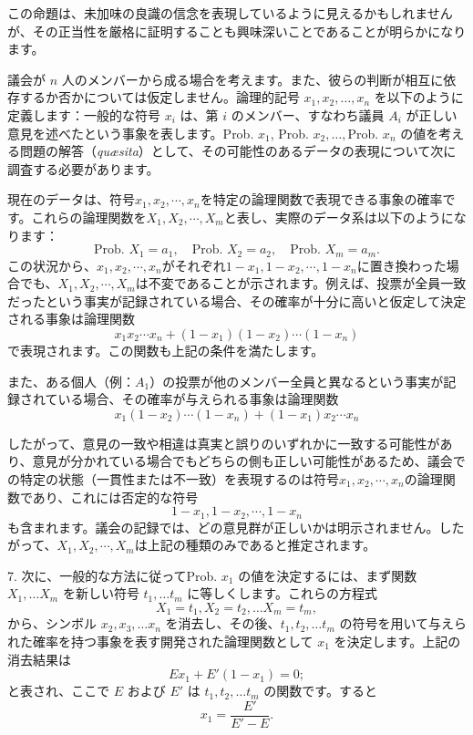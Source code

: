 \documentclass[a4paper,11pt,openany]{ltjsbook}
\begin{document}
この命題は、未加味の良識の信念を表現しているように見えるかもしれませんが、その正当性を厳格に証明することも興味深いことであることが明らかになります。

議会が $n$ 人のメンバーから成る場合を考えます。また、彼らの判断が相互に依存するか否かについては仮定しません。論理的記号 $x_1, x_2, \dotsc, x_n$ を以下のように定義します：一般的な符号 $x_i$ は、第 $i$ のメンバー、すなわち議員 $A_i$ が正しい意見を述べたという事象を表します。Prob. $x_1$, Prob. $x_2, \dotsc, $Prob. $x_n$ の値を考える問題の解答（\textit{qu{\ae}sita}）として、その可能性のあるデータの表現について次に調査する必要があります。

現在のデータは、符号$x_1, x_2, \dotsb, x_n$を特定の論理関数で表現できる事象の確率です。これらの論理関数を$X_1, X_2, \dotsb, X_m$と表し、実際のデータ系は以下のようになります：
\[
  \text{Prob. }X_1 = a_1,\quad
  \text{Prob. }X_2 = a_2,\quad
  \text{Prob. }X_m = a_m.
\]
この状況から、$x_1, x_2, \dotsb, x_n$がそれぞれ$1-x_1, 1-x_2, \dotsb, 1-x_n$に置き換わった場合でも、$X_1, X_2, \dotsb, X_m$は不変であることが示されます。例えば、投票が全員一致だったという事実が記録されている場合、その確率が十分に高いと仮定して決定される事象は論理関数
\[
  x_1 x_2 \dotsm x_n + (1-x_1)(1-x_2)\dotsm (1-x_n)
\]
で表現されます。この関数も上記の条件を満たします。

また、ある個人（例：$A_1$）の投票が他のメンバー全員と異なるという事実が記録されている場合、その確率が与えられる事象は論理関数
\[
  x_1(1-x_2)\dotsm (1-x_n) + (1-x_1)x_2\dotsm x_n
\]

したがって、意見の一致や相違は真実と誤りのいずれかに一致する可能性があり、意見が分かれている場合でもどちらの側も正しい可能性があるため、議会での特定の状態（一貫性または不一致）を表現するのは符号$x_1, x_2, \dotsb, x_n$の論理関数であり、これには否定的な符号
\[
  1-x_1, 1-x_2, \dotsb, 1-x_n
\]
も含まれます。議会の記録では、どの意見群が正しいかは明示されません。したがって、$X_1, X_2, \dotsb, X_m$は上記の種類のみであると推定されます。

7. 次に、一般的な方法に従ってProb. \(x_1\) の値を決定するには、まず関数 \(X_1, \dotsc X_m\) を新しい符号 \(t_1, \dotsc t_m\) に等しくします。これらの方程式
\[
  X_1 = t_1, X_2 = t_2, \dotsc X_m = t_m,
\]
から、シンボル \(x_2, x_3,\dotsc x_n\) を消去し、その後、\(t_1, t_2, \dotsc t_m\) の符号を用いて与えられた確率を持つ事象を表す開発された論理関数として \(x_1\) を決定します。上記の消去結果は
\[
  Ex_1 + E'(1-x_1) = 0;    \tag{1}
\]
と表され、ここで \(E\) および \(E'\) は \(t_1, t_2, \dotsc t_m\) の関数です。すると
\[
  x_1 = \frac{E'}{E'-E}.   \tag{2}
\]
\end{document}
